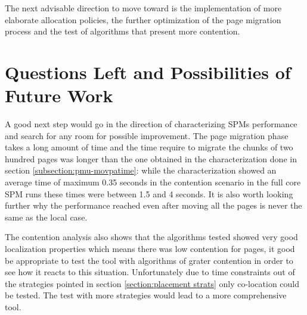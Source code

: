 The next advisable direction to move toward is the implementation of more elaborate allocation policies, the further optimization of the page migration process and the test of algorithms that present more contention.

\section{Questions Left and Possibilities of Future Work}\label{section:resfutwork}

A good next step would go in the direction of characterizing SPMs performance and search for any room for possible improvement. The page migration phase takes a long amount of time and the time require to migrate the chunks of two hundred pages was longer than the one obtained in the characterization done in section \ref{subsection:pmu-movpatime}: while the characterization showed an average time of maximum 0.35 seconds in the contention scenario in the full core SPM runs these times were between 1.5 and 4 seconds. It is also worth looking further why the performance reached even after moving all the pages is never the same as the local case.
 
The contention analysis also shows that the algorithms tested showed very good localization properties which means there was low contention for pages, it good be appropriate to test the tool with algorithms of grater contention in order to see how it reacts to this situation.
Unfortunately due to time constraints out of the strategies pointed in section \ref{section:placement strats} only co-location could be tested. The test with more strategies would lead to a more comprehensive tool.

